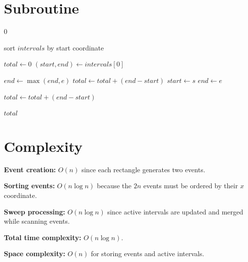 \documentclass{article}
\begin{document}
\section*{Subroutine}

\begin{algorithm}
\caption{ComputeUnionLength(intervals)}
\begin{algorithmic}[1]

    \State \Return $0$
\EndIf

\State sort $intervals$ by start coordinate

\State $total \gets 0$
\State $(start,end) \gets intervals[0]$


        \State $end \gets \max(end,e)$
    \Else
        \State $total \gets total + (end - start)$
        \State $start \gets s$
        \State $end \gets e$
    \EndIf

\EndFor

\State $total \gets total + (end - start)$

\State \Return $total$

\end{algorithmic}
\end{algorithm}

\section*{Complexity}

\textbf{Event creation:} $O(n)$ since each rectangle generates two events.

\textbf{Sorting events:} $O(n \log n)$ because the $2n$ events must be ordered by their $x$ coordinate.

\textbf{Sweep processing:} $O(n \log n)$ since active intervals are updated and merged while scanning events.

\textbf{Total time complexity:} $O(n \log n)$.

\textbf{Space complexity:} $O(n)$ for storing events and active intervals.
\end{document}

